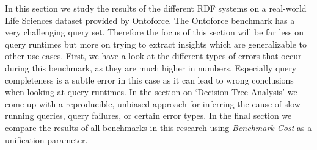 
In this section we study the results of the different RDF systems on a real-world Life Sciences dataset provided by Ontoforce. 
The Ontoforce benchmark has a very challenging query set. Therefore the focus of this section will be far less on query runtimes but more on trying to extract insights which are generalizable to other use cases.
First, we have a look at the different types of errors that occur during this benchmark, as they are much higher in numbers. Especially query completeness is a subtle error in this case as it can lead to wrong conclusions when looking at query runtimes. 
In the section on `Decision Tree Analysis' we come up with a reproducible, unbiased approach for inferring the cause of slow-running queries, query failures, or certain error types. 
In the final section we compare the results of all benchmarks in this research using \emph{Benchmark Cost} as a unification parameter. 


%

